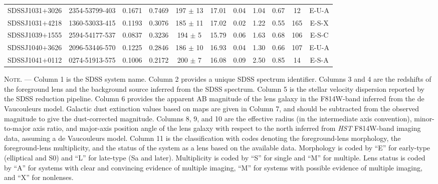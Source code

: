 \documentclass{emulateapj}
\begin{document}
\begin{table*}[htbp]
\begin{center}
\begin{tabular}{c c c c c c c c c c c}
SDSSJ1031$+$3026 & 2354-53799-403 & 0.1671 & 0.7469 & 197 $\pm$   13 & 17.01 & 0.04 & 1.04 & 0.67 & 12 & E-U-A \\ 
SDSSJ1031$+$4218 & 1360-53033-415 & 0.1193 & 0.3076 & 185 $\pm$   11 & 17.02 & 0.02 & 1.22 & 0.55 & 165 & E-S-X \\ 
SDSSJ1039$+$1555 & 2594-54177-537 & 0.0837 & 0.3236 & 194 $\pm$    5 & 15.79 & 0.06 & 1.63 & 0.68 & 106 & E-S-C \\ 
SDSSJ1040$+$3626 & 2096-53446-570 & 0.1225 & 0.2846 & 186 $\pm$   10 & 16.93 & 0.04 & 1.30 & 0.66 & 107 & E-U-A \\ 
SDSSJ1041$+$0112 & 0274-51913-575 & 0.1006 & 0.2172 & 200 $\pm$    7 & 16.08 & 0.09 & 2.50 & 0.85 & 14 & E-S-A \\ 
\hline \hline
\end{tabular}
\end{center}
\textsc{      Note.} --- Column 1 is the SDSS system name. Column 2 provides a unique SDSS spectrum identifier. Columns 3 and 4 are the redshifts of the foreground lens and the background source inferred from the SDSS spectrum. Column 5 is the stellar velocity dispersion reported by the SDSS reduction pipeline. Column 6 provides the apparent AB magnitude of the lens galaxy in the F814W-band inferred from the de Vaucouleurs model. Galactic dust extinction values based on \citet{Schlegel98} maps are given in Column 7, and should be subtracted from the observed magnitude to give the dust-corrected magnitude. Columns 8, 9, and 10 are the effective radius (in the intermediate axis convention), minor-to-major axis ratio, and major-axis position angle of the lens galaxy with respect to the north inferred from \textsl{HST} F814W-band imaging data, assuming a de Vaucouleurs model. Column 11 is the classification with codes denoting the foreground-lens morphology, the foreground-lens multiplicity, and the status of the system as a lens based on the available data. Morphology is coded by ``E'' for early-type (elliptical and S0) and ``L'' for late-type (Sa and later). Multiplicity is coded by ``S'' for single and ``M'' for multiple. Lens status is coded by ``A'' for systems with clear and convincing evidence of multiple imaging, ``M'' for systems with possible evidence of multiple imaging, and ``X'' for nonlenses. \\
\end{table*}
\addtocounter{table}{-1}
\end{document}
